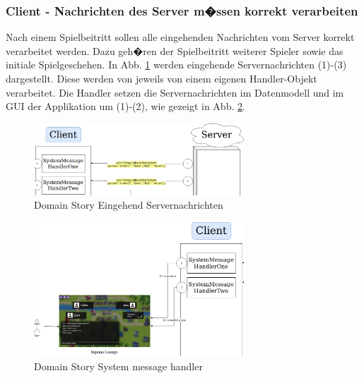 \documentclass[12pt, titlepage]{scrartcl}
\begin{document}
		\subsubsection{Client - Nachrichten des Server m�ssen korrekt verarbeiten} Nach einem Spielbeitritt sollen alle eingehenden Nachrichten vom Server korrekt verarbeitet werden. Dazu geh�ren der Spielbeitritt weiterer Spieler sowie das initiale Spielgeschehen. In Abb. \ref{DomainStoryHandler2} werden eingehende Servernachrichten (1)-(3) dargestellt. Diese werden von jeweils von einem eigenen Handler-Objekt verarbeitet. Die Handler setzen die Servernachrichten im Datenmodell und im GUI der Applikation um (1)-(2), wie gezeigt in Abb. \ref{DomainStoryHandler1}.
			\begin{figure}[H] 
				\centering
				\includegraphics[width=0.7\textwidth]{Handler2.png}
				\caption{Domain Story Eingehend Servernachrichten}
				\label{DomainStoryHandler2}
			\end{figure}
			\begin{figure}[H] 
				\centering
				\includegraphics[width=0.7\textwidth]{Handler1.png}
				\caption{Domain Story System message handler}
				\label{DomainStoryHandler1}
			\end{figure}
\end{document}
